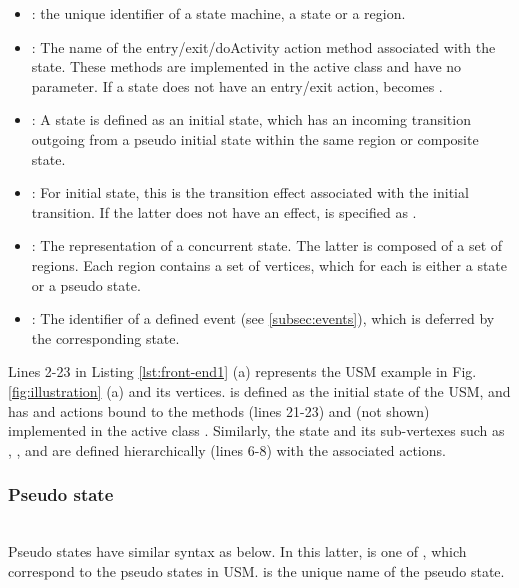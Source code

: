 \noindent
{}
\begin{itemize}[\footnotesize]
	\item {}: the unique identifier of a state machine, a state or a region.
	
	\item {}: The name of the entry/exit/doActivity action method associated with the state. 
	These methods are implemented in the active class and have no parameter.
	If a state does not have an entry/exit action,  becomes .
	
	\item {}: A state is defined as an initial state, which has an incoming transition outgoing from a pseudo initial state within the same region or composite state. 
	
	\item {}: For initial state, this is the transition effect associated with the initial transition.
	If the latter does not have an effect,  is specified as .
	
	\item {}: The representation of a concurrent state. 
	The latter is composed of a set of regions.
	Each region contains a set of vertices, which for each is either a state or a pseudo state.
	
	\item {}: The identifier of a defined event (see \ref{subsec:events}), which is deferred by the corresponding state. 
\end{itemize}

\noindent
{}
Lines 2-23 in Listing \ref{lst:front-end1} (a) represents the USM example in Fig. \ref{fig:illustration} (a) and its vertices.
 is defined as the initial state of the USM, and has  and  actions bound to the methods  (lines 21-23) and  (not shown) implemented in the active class .
Similarly, the state  and its sub-vertexes such as , , and  are defined hierarchically (lines 6-8) with the associated actions.

\subsubsection{Pseudo state} ~\\
Pseudo states have similar syntax as below.
In this latter,  is one of , which correspond to the pseudo states in USM. 
 is the unique name of the pseudo state.

